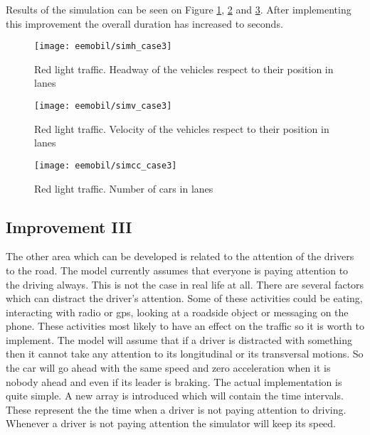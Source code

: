 		Results of the simulation can be seen on Figure \ref{fig:red_light_situationh_impr2}, \ref{fig:red_light_situationv_impr2} and \ref{fig:red_light_situationcc_impr2}. After implementing this improvement the overall duration has increased to seconds.
		\begin{figure}[ht]
			\centering
			\texttt{[image: eemobil/simh\_case3]}
			\caption{Red light traffic. Headway of the vehicles respect to their position in lanes}
			\label{fig:red_light_situationh_impr2}
		\end{figure}
		\begin{figure}[ht]
			\centering
			\texttt{[image: eemobil/simv\_case3]}
			\caption{Red light traffic. Velocity of the vehicles respect to their position in lanes}
			\label{fig:red_light_situationv_impr2}
		\end{figure}
		\begin{figure}[ht]
			\centering
			\texttt{[image: eemobil/simcc\_case3]}
			\caption{Red light traffic. Number of cars in lanes }
			\label{fig:red_light_situationcc_impr2}
		\end{figure}
		\subsection{Improvement III}
		The other area which can be developed is related to the attention of the drivers to the road. The model currently assumes that everyone is paying attention to the driving always. This is not the case in real life at all. There are several factors which can distract the driver's attention. Some of these activities could be eating, interacting with radio or gps, looking at a roadside object or messaging on the phone. These activities most likely to have an effect on the traffic so it is worth to implement. The model will assume that if a driver is distracted with something then it cannot take any attention to its longitudinal or its transversal motions. So the car will go ahead with the same speed and zero acceleration when it is nobody ahead and even if its leader is braking. The actual implementation is quite simple. A new array is introduced which will contain the time intervals. These represent the the time when a driver is not paying attention to driving. Whenever a driver is not paying attention the simulator will keep its speed.

